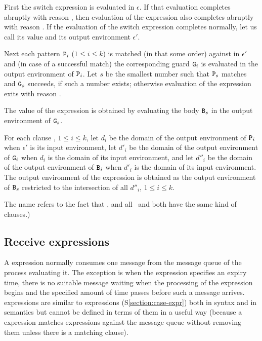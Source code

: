 First the switch expression  is evaluated in $\epsilon$.  If
that evaluation completes abruptly with reason , then evaluation
of the  expression also completes abruptly with reason .
If the evaluation of the switch expression completes normally, let us
call its value  and its output environment $\epsilon'$.

Next each pattern ${\tt{\sl P}}_i$ ($1\leq i\leq k$) is matched
(in \ifStd that \fi \ifOld some \fi order)
against  in $\epsilon'$ and (in case of a successful
match) the corresponding guard ${\tt{\sl G}}_i$ is evaluated in the output
environment of ${\tt{\sl P}}_i$.  Let $s$ be the smallest number such that
${\tt{\sl P}}_s$ matches  and ${\tt{\sl G}}_s$ succeeds, if such a number
exists; otherwise evaluation of the  expression exits with
reason .

The value of the  expression is obtained by evaluating the
body ${\tt{\sl B}}_s$ in the output environment of ${\tt{\sl G}}_s$.

\ENVIRONMENTS

For each clause , $1\leq
i\leq k$, let $d_i$ be the domain of the output environment of
${\tt{\sl P}}_i$ when $\epsilon'$ is its input environment, let $d'_i$ be
the domain of the output environment of ${\tt{\sl G}}_i$ when $d_i$ is the
domain of its input environment, and let $d''_i$ be the domain of the
output environment of ${\tt{\sl B}}_i$ when $d'_i$ is the domain of its
input environment.  The output environment of the  expression
is obtained as the output environment of ${\tt{\sl B}}_s$ restricted to the
intersection of all $d''_i$, $1\leq i\leq k$.

\NOTE

The name \NT{\CrtClause} refers to the fact that %
\ifStd,  and  all \else\ and  both \fi
have the same kind of clauses.)

\subsection{Receive expressions}

\label{section:receive-expr}

A  expression normally consumes one message from the
message queue of the process evaluating it.  The exception is when the
 expression specifies an expiry time, there is no suitable
message waiting when the processing of the  expression
begins and the specified amount of time passes before such a message
arrives.  expressions are similar to  expressions
(S\ref{section:case-expr}) both in syntax and in semantics but cannot
be defined in terms of them in a useful way (because a 
expression matches expressions against the message queue without
removing them unless there is a matching clause).

